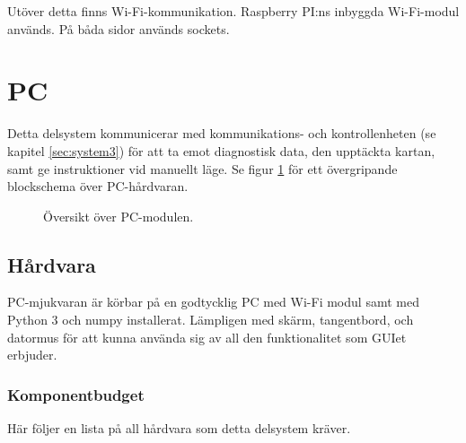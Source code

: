 \documentclass[a4paper,11pt]{article}
\begin{document}
Utöver detta finns Wi-Fi-kommunikation. Raspberry PI:ns inbyggda Wi-Fi-modul används. På båda sidor används sockets.

\clearpage
\section{PC} \label{sec:system4}
Detta delsystem kommunicerar med kommunikations- och kontrollenheten (se kapitel \ref{sec:system3}) för att ta emot diagnostisk data, den upptäckta kartan, samt ge instruktioner vid manuellt läge. Se figur \ref{fig:unitPC} för ett övergripande blockschema över PC-hårdvaran.

\begin{figure}[h!]
    \caption{Översikt över PC-modulen.}
    \label{fig:unitPC}
\end{figure}
\subsection{Hårdvara}
PC-mjukvaran är körbar på en godtycklig PC med Wi-Fi modul samt med Python 3 och numpy installerat. Lämpligen med skärm, tangentbord, och datormus för att kunna använda sig av all den funktionalitet som GUIet erbjuder.

\subsubsection{Komponentbudget}
Här följer en lista på all hårdvara som detta delsystem kräver.

\begin{center}
\begin{HardwareList}
\end{HardwareList}
\end{center}
\end{document}
